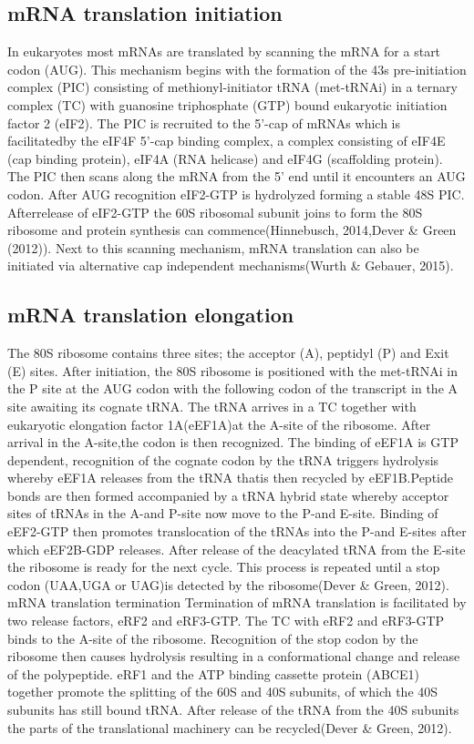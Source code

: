 \documentclass[12pt,openany]{book}
\begin{document}
\subsection{mRNA translation initiation}

In eukaryotes most mRNAs are translated by scanning the mRNA for a start
codon (AUG). This mechanism begins with the formation of the 43s
pre-initiation complex (PIC) consisting of methionyl-initiator tRNA
(met-tRNAi) in a ternary complex (TC) with guanosine triphosphate (GTP)
bound eukaryotic initiation factor 2 (eIF2). The PIC is recruited to the
5'-cap of mRNAs which is facilitatedby the eIF4F 5'-cap binding complex,
a complex consisting of eIF4E (cap binding protein), eIF4A (RNA
helicase) and eIF4G (scaffolding protein). The PIC then scans along the
mRNA from the 5' end until it encounters an AUG codon. After AUG
recognition eIF2-GTP is hydrolyzed forming a stable 48S PIC.
Afterrelease of eIF2-GTP the 60S ribosomal subunit joins to form the 80S
ribosome and protein synthesis can commence(Hinnebusch, 2014,Dever \&
Green (2012)). Next to this scanning mechanism, mRNA translation can
also be initiated via alternative cap independent mechanisms(Wurth \&
Gebauer, 2015).

\subsection{mRNA translation elongation}

The 80S ribosome contains three sites; the acceptor (A), peptidyl (P)
and Exit (E) sites. After initiation, the 80S ribosome is positioned
with the met-tRNAi in the P site at the AUG codon with the following
codon of the transcript in the A site awaiting its cognate tRNA. The
tRNA arrives in a TC together with eukaryotic elongation factor
1A(eEF1A)at the A-site of the ribosome. After arrival in the A-site,the
codon is then recognized. The binding of eEF1A is GTP dependent,
recognition of the cognate codon by the tRNA triggers hydrolysis whereby
eEF1A releases from the tRNA thatis then recycled by eEF1B.Peptide bonds
are then formed accompanied by a tRNA hybrid state whereby acceptor
sites of tRNAs in the A-and P-site now move to the P-and E-site. Binding
of eEF2-GTP then promotes translocation of the tRNAs into the P-and
E-sites after which eEF2B-GDP releases. After release of the deacylated
tRNA from the E-site the ribosome is ready for the next cycle. This
process is repeated until a stop codon (UAA,UGA or UAG)is detected by
the ribosome(Dever \& Green, 2012). mRNA translation termination
Termination of mRNA translation is facilitated by two release factors,
eRF2 and eRF3-GTP. The TC with eRF2 and eRF3-GTP binds to the A-site of
the ribosome. Recognition of the stop codon by the ribosome then causes
hydrolysis resulting in a conformational change and release of the
polypeptide. eRF1 and the ATP binding cassette protein (ABCE1) together
promote the splitting of the 60S and 40S subunits, of which the 40S
subunits has still bound tRNA. After release of the tRNA from the 40S
subunits the parts of the translational machinery can be recycled(Dever
\& Green, 2012).
\end{document}
